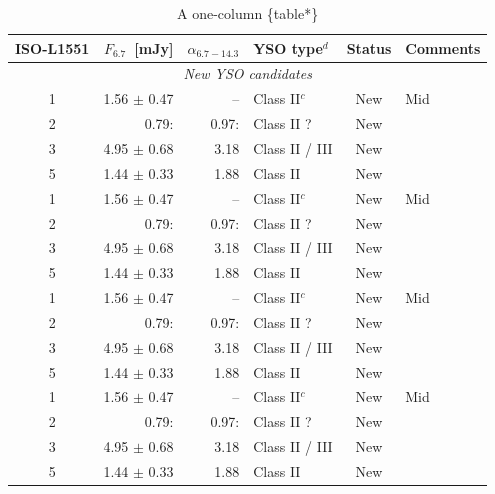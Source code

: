 \documentclass{aa}
\begin{document}
\begin{appendix}
\begin{table}[ht!]
\caption {A one-column \{table*\} \newline}
\label{table:2} 
\centering
\begin{tabular}{crrlcl}
\hline\hline             
ISO-L1551 & $F_{6.7}$~[mJy] & $\alpha_{6.7-14.3}$
& YSO type$^{d}$ & Status & Comments\\
\hline
  \multicolumn{6}{c}{\it New YSO candidates}\\ %
\hline
  1 & 1.56 $\pm$ 0.47 & --    & Class II$^{c}$ & New & Mid\\
  2 & 0.79:           & 0.97: & Class II ?     & New & \\
  3 & 4.95 $\pm$ 0.68 & 3.18  & Class II / III & New & \\
  5 & 1.44 $\pm$ 0.33 & 1.88  & Class II       & New & \\
  1 & 1.56 $\pm$ 0.47 & --    & Class II$^{c}$ & New & Mid\\
  2 & 0.79:           & 0.97: & Class II ?     & New & \\
  3 & 4.95 $\pm$ 0.68 & 3.18  & Class II / III & New & \\
  5 & 1.44 $\pm$ 0.33 & 1.88  & Class II       & New & \\
  1 & 1.56 $\pm$ 0.47 & --    & Class II$^{c}$ & New & Mid\\
  2 & 0.79:           & 0.97: & Class II ?     & New & \\
  3 & 4.95 $\pm$ 0.68 & 3.18  & Class II / III & New & \\
  5 & 1.44 $\pm$ 0.33 & 1.88  & Class II       & New & \\
  1 & 1.56 $\pm$ 0.47 & --    & Class II$^{c}$ & New & Mid\\
  2 & 0.79:           & 0.97: & Class II ?     & New & \\
  3 & 4.95 $\pm$ 0.68 & 3.18  & Class II / III & New & \\
  5 & 1.44 $\pm$ 0.33 & 1.88  & Class II       & New & \\


\end{tabular}
\end{table}
\end{appendix}
\end{document}
